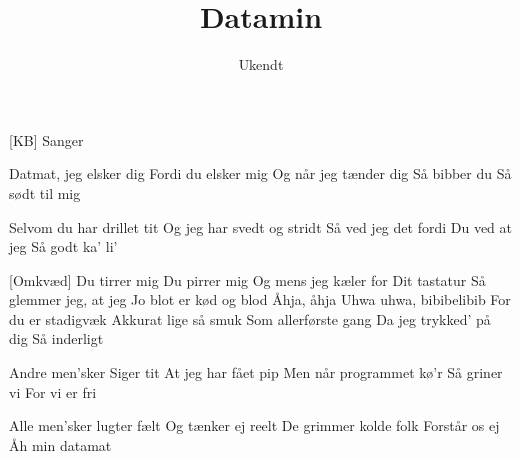 \documentclass[a4paper,11pt]{article}
\title{Datamin}
\author{Ukendt}
\begin{document}
\maketitle

\begin{roles}
[KB] Sanger
\end{roles}

\begin{song}

 Datmat, jeg elsker dig
  Fordi du elsker mig
  Og når jeg tænder dig
  Så bibber du
  Så sødt til mig

 Selvom du har drillet tit
  Og jeg har svedt og stridt
  Så ved jeg det fordi
  Du ved at jeg
  Så godt ka' li'
  
[Omkvæd] Du tirrer mig
  Du pirrer mig
  Og mens jeg kæler for
  Dit tastatur
  Så glemmer jeg, at jeg
  Jo blot er kød og blod
  Åhja, åhja
  Uhwa uhwa, bibibelibib
  For du er stadigvæk
  Akkurat lige så smuk
  Som allerførste gang
  Da jeg trykked' på dig
  Så inderligt

 Andre men'sker
  Siger tit
  At jeg har fået pip
  Men når programmet kø'r
  Så griner vi
  For vi er fri
  
 Alle men'sker lugter fælt
  Og tænker ej reelt
  De grimmer kolde folk
  Forstår os ej
  Åh min datamat


\end{song}
\end{document}
